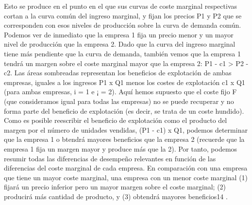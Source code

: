 \documentclass[10pt,a4paper]{article}
\begin{document}
Esto se produce en el punto en el que sus curvas de coste marginal respectivas cortan a la curva común del ingreso marginal, y fijan los precios P1 y P2 que se corresponden con esos niveles de producción sobre la curva de demanda común. Podemos ver de inmediato que la empresa 1 fija un precio menor y un mayor nivel de producción que la empresa 2. Dado que la curva del ingreso marginal tiene más pendiente que la curva de demanda, también vemos que la empresa 1 tendrá un margen sobre el coste marginal mayor que la empresa 2: P1 - c1 > P2 - c2. Las áreas sombreadas representan los beneficios de explotación de ambas empresas, iguales a los ingresos P1 x Q1 menos los costes de explotación c1 x Q1 (para ambas empresas, i = 1 e ¡ = 2). Aquí hemos supuesto que el coste fijo F (que consideramos igual para todas las empresas) no se puede recuperar y no forma parte del beneficio de explotación (es decir, se trata de un coste hundido). Como es posible reescribir el beneficio de explotación como el producto del margen por el número de unidades vendidas, (P1 - c1) x Q1, podemos determinar que la empresa 1 o btendrá mayores beneficios que la empresa 2 (recuerde que la empresa 1 fija un margen mayor y produce más que la 2). Por tanto, podemos resumir todas las diferencias de desempeño relevantes en función de las diferencias del coste marginal de cada empresa. En comparación con una empresa que tiene un mayor coste marginal, una empresa con un menor coste marginal (1) fijará un precio inferior pero un mayor margen sobre el coste marginal; (2) producirá más cantidad de producto, y (3) obtendrá mayores beneficios14 .
\end{document}
